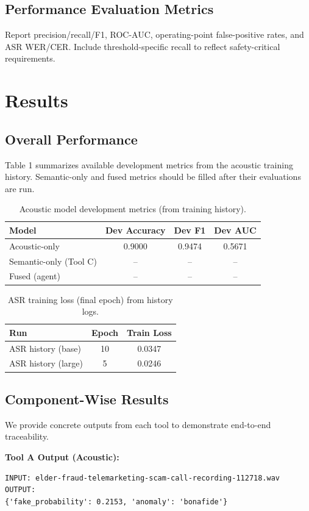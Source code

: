 \documentclass[11pt,a4paper]{article}
\begin{document}
\subsection{Performance Evaluation Metrics}
Report precision/recall/F1, ROC-AUC, operating-point false-positive rates, and ASR WER/CER. Include threshold-specific recall to reflect safety-critical requirements.

\section{Results}
\subsection{Overall Performance}
Table 1 summarizes available development metrics from the acoustic training history. Semantic-only and fused metrics should be filled after their evaluations are run.

\begin{table}[h]
\centering
\caption{Acoustic model development metrics (from training history).}
\begin{tabular}{lccc}
\toprule
Model & Dev Accuracy & Dev F1 & Dev AUC \\
\midrule
Acoustic-only & 0.9000 & 0.9474 & 0.5671 \\
Semantic-only (Tool C) & -- & -- & -- \\
Fused (agent) & -- & -- & -- \\
\bottomrule
\end{tabular}
\end{table}

\begin{table}[h]
\centering
\caption{ASR training loss (final epoch) from history logs.}
\begin{tabular}{lcc}
\toprule
Run & Epoch & Train Loss \\
\midrule
ASR history (base) & 10 & 0.0347 \\
ASR history (large) & 5 & 0.0246 \\
\bottomrule
\end{tabular}
\end{table}

\subsection{Component-Wise Results}
We provide concrete outputs from each tool to demonstrate end-to-end traceability.

\textbf{Tool A Output (Acoustic):}
\begin{verbatim}
INPUT: elder-fraud-telemarketing-scam-call-recording-112718.wav
OUTPUT:
{'fake_probability': 0.2153, 'anomaly': 'bonafide'}
\end{verbatim}
\end{document}
